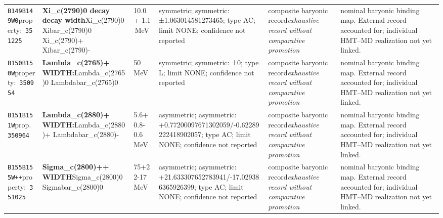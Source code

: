 \begin{landscape}
\begin{longtable}{L{1.85cm}L{4.45cm}L{2.35cm}L{4.05cm}L{3.35cm}L{7.15cm}}
\texttt{B149}\newline \texttt{B149W0}\newline property:\ \texttt{351225} & \textbf{Xi\_\allowbreak{}c(2790)0 decay decay width}\newline Xi\_\allowbreak{}c(2790)0 \textbar{}\allowbreak{} Xibar\_\allowbreak{}c(2790)0 \textbar{}\allowbreak{} Xi\_\allowbreak{}c(2790)+ \textbar{}\allowbreak{} Xibar\_\allowbreak{}c(2790)- & 10.0+-1.1\,MeV & symmetric; symmetric: ±1.063014581273465; type AC; limit NONE; confidence not reported & composite baryonic record\newline \emph{exhaustive record without comparative promotion} & nominal baryonic binding map. External record accounted for; individual HMT--MD realization not yet linked. \\
\texttt{B150}\newline \texttt{B150W}\newline property:\ \texttt{350954} & \textbf{Lambda\_\allowbreak{}c(2765)+ WIDTH:}\newline Lambda\_\allowbreak{}c(2765)0 \textbar{}\allowbreak{} Lambdabar\_\allowbreak{}c(2765)0 & 50\,MeV & symmetric; symmetric: ±0; type L; limit NONE; confidence not reported & composite baryonic record\newline \emph{exhaustive record without comparative promotion} & nominal baryonic binding map. External record accounted for; individual HMT--MD realization not yet linked. \\
\texttt{B151}\newline \texttt{B151W}\newline prop.\ \texttt{350964} & \textbf{Lambda\_\allowbreak{}c(2880)+ WIDTH:}\newline Lambda\_\allowbreak{}c(2880)+ \textbar{}\allowbreak{} Lambdabar\_\allowbreak{}c(2880)- & 5.6+0.8-0.6\,MeV & asymmetric; asymmetric: +0.77200097671302059/-0.62289222418902057; type AC; limit NONE; confidence not reported & composite baryonic record\newline \emph{exhaustive record without comparative promotion} & nominal baryonic binding map. External record accounted for; individual HMT--MD realization not yet linked. \\
\texttt{B155}\newline \texttt{B155W++}\newline property:\ \texttt{351025} & \textbf{Sigma\_\allowbreak{}c(2800)++ WIDTH}\newline Sigma\_\allowbreak{}c(2800)0 \textbar{}\allowbreak{} Sigmabar\_\allowbreak{}c(2800)0 & 75+22-17\,MeV & asymmetric; asymmetric: +21.633307652783941/-17.029386365926399; type AC; limit NONE; confidence not reported & composite baryonic record\newline \emph{exhaustive record without comparative promotion} & nominal baryonic binding map. External record accounted for; individual HMT--MD realization not yet linked. \\

\end{longtable}
\end{landscape}
